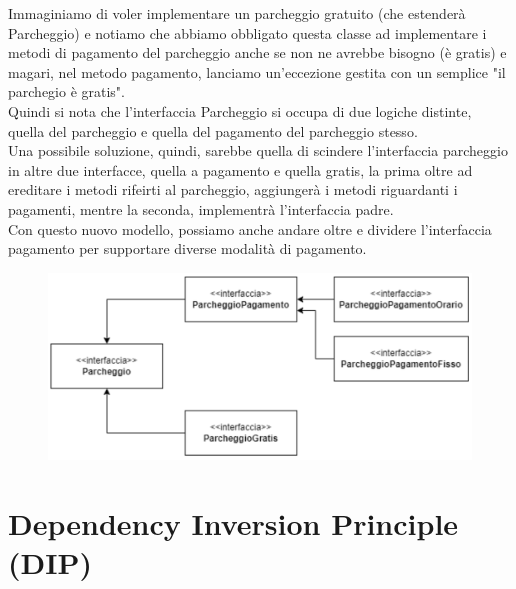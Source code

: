 Immaginiamo di voler implementare un parcheggio gratuito (che estenderà Parcheggio) e notiamo che abbiamo obbligato questa classe ad implementare i metodi di pagamento del parcheggio anche se non ne avrebbe bisogno (è gratis) e magari, nel metodo pagamento, lanciamo un'eccezione gestita con un semplice "il parchegio è gratis".\\
Quindi si nota che l'interfaccia Parcheggio si occupa di due logiche distinte, quella del parcheggio e quella del pagamento del parcheggio stesso.\\
Una possibile soluzione, quindi, sarebbe quella di scindere l'interfaccia parcheggio in altre due interfacce, quella a pagamento e quella gratis, la prima oltre ad ereditare i metodi rifeirti al parcheggio, aggiungerà i metodi riguardanti i pagamenti, mentre la seconda, implementrà l'interfaccia padre.\\
Con questo nuovo modello, possiamo anche andare oltre e dividere l'interfaccia pagamento per supportare diverse modalità di pagamento.\\

\begin{figure}[H]
  \centering
  \includegraphics[width=0.5\linewidth]{../../immagini/principio_SOLID/refactoring_interfaccia.png}
\end{figure}

\section{Dependency Inversion Principle (DIP)}

